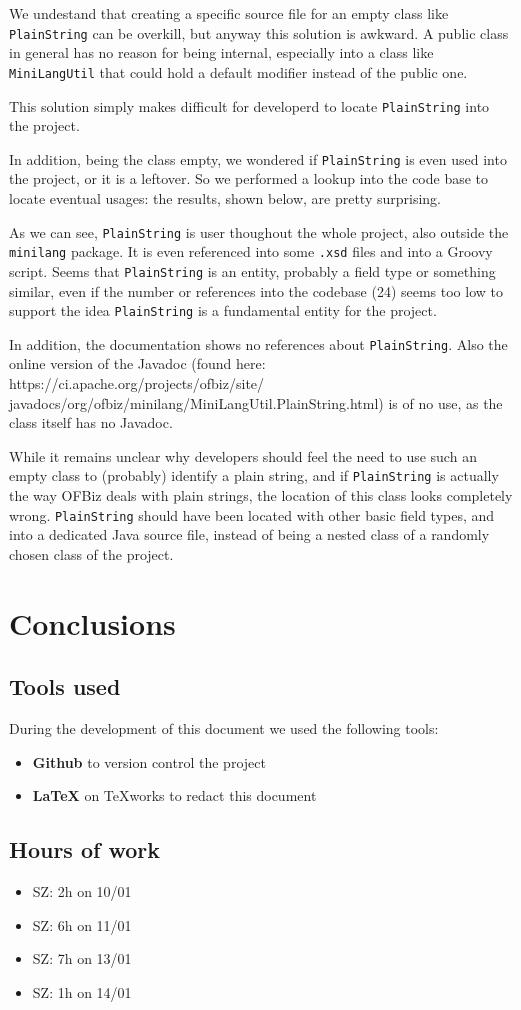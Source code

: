 \documentclass[11pt]{article} %
\begin{document}
We undestand that creating a specific source file for an empty class like \texttt{PlainString} can be overkill, but anyway this solution is awkward. A public class in general has no reason for being internal, especially into a class like \texttt{MiniLangUtil} that could hold a default modifier instead of the public one.

This solution simply makes difficult for developerd to locate \texttt{PlainString} into the project. 

In addition, being the class empty, we wondered if \texttt{PlainString} is even used into the project, or it is a leftover. So we performed a lookup into the code base to locate eventual usages: the results, shown below, are pretty surprising.



As we can see, \texttt{PlainString} is user thoughout the whole project, also outside the \texttt{minilang} package. It is even referenced into some \texttt{.xsd} files and into a Groovy script. Seems that \texttt{PlainString} is an entity, probably a field type or something similar, even if the number or references into the codebase (24) seems too low to support the idea \texttt{PlainString} is a fundamental entity for the project.

In addition, the documentation shows no references about \texttt{PlainString}. Also the online version of the Javadoc (found here: https://ci.apache.org/projects/ofbiz/site/ javadocs/org/ofbiz/minilang/MiniLangUtil.PlainString.html) is of no use, as the class itself has no Javadoc.

While it remains unclear why developers should feel the need to use such an empty class to (probably) identify a plain string, and if \texttt{PlainString} is actually the way OFBiz deals with plain strings, the location of this class looks completely wrong.  \texttt{PlainString} should have been located with other basic field types, and into a dedicated Java source file, instead of being a nested class of a randomly chosen class of the project.


\section{Conclusions}

\subsection{Tools used}
During the development of this document we used the following tools:
\begin{itemize}
	\item \textbf{Github} to version control the project
	\item \textbf{\LaTeX} on TeXworks to redact this document
\end{itemize}

\subsection{Hours of work}
\begin{itemize}
	\item SZ: 2h on 10/01
	\item SZ: 6h on 11/01
	\item SZ: 7h on 13/01
	\item SZ: 1h on 14/01
\end{itemize}
\end{document}
